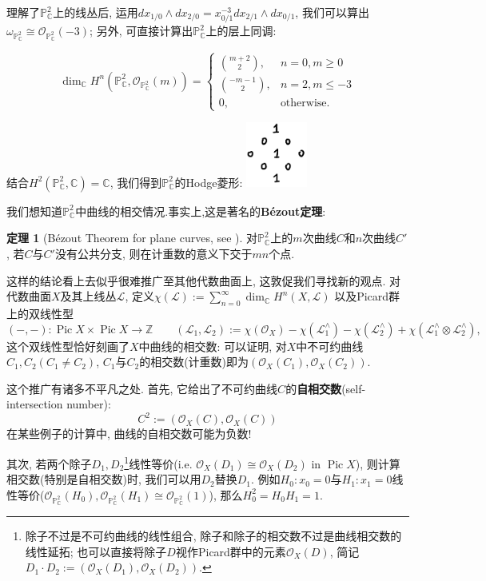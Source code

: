 \documentclass[UTF8,12pt,twoside]{article}
\theoremstyle{definition}
\newtheorem{thm}{定理}[section]
\newcommand{\ZZ}{\mathbb{Z}}  %
\newcommand{\CC}{\mathbb{C}}  %
\newcommand{\PCC}{\mathbb{P}_{\CC}^2} %
\newcommand{\Pic}{\operatorname{Pic}}
\numberwithin{equation}{section}
\begin{document}
理解了$\PCC$上的线丛后, 运用$dx_{1/0}\wedge dx_{2/0} = x_{0/1}^{-3}dx_{2/1} \wedge dx_{0/1}$, 我们可以算出$\omega_{\PCC} \cong \mathcal{O}_{\PCC} (-3)$; 另外, 可直接计算出$\PCC$上的层上同调\cite[18.1.3]{vakil2017rising}: 

$$\dim_{\CC}H^n\left(\PCC,\mathcal{O}_{\PCC}(m)\right)=\begin{cases}
\binom{m+2}{2},& n=0, m\geqslant 0\\
\binom{-m-1}{2}, & n=2,m \leqslant -3\\
0,& \text{otherwise.}
\end{cases}$$

结合$H^2(\PCC,\CC)=\CC$, 我们得到$\PCC$的Hodge菱形: \includegraphics[width=2cm]{9-7-fig/hodgeofp2.png}


我们想知道$\PCC$中曲线的相交情况.事实上,这是著名的\textbf{B\'ezout定理}:

\begin{thm}[B\'ezout Theorem for plane curves, see {\cite[18.6.K]{vakil2017rising}}]
	对$\PCC$上的$m$次曲线$C$和$n$次曲线$C'$, 若$C$与$C'$没有公共分支, 则在计重数的意义下交于$mn$个点.
\end{thm}

这样的结论看上去似乎很难推广至其他代数曲面上, 这敦促我们寻找新的观点. 对代数曲面$X$及其上线丛$\mathcal{L}$, 定义$\chi(\mathcal{L}):=\sum_{n=0}^{\infty}\dim_{\CC} H^n(X,\mathcal{L})$ 以及Picard群上的双线性型
$$(-,-):\Pic X \times \Pic X \longrightarrow \ZZ \qquad (\mathcal{L}_1,\mathcal{L}_2):=\chi(\mathcal{O}_X)-\chi(\mathcal{L}_1^{\wedge})-\chi(\mathcal{L}_2^{\wedge})+\chi(\mathcal{L}_1^{\wedge}\otimes \mathcal{L}_2^{\wedge}), $$
这个双线性型恰好刻画了$X$中曲线的相交数: 可以证明, 对$X$中不可约曲线$C_1,C_2(C_1 \neq C_2)$, $C_1$与$C_2$的相交数(计重数)即为$(\mathcal{O}_X(C_1),\mathcal{O}_X(C_2))$.

这个推广有诸多不平凡之处. 首先, 它给出了不可约曲线$C$的\textbf{自相交数}(self-intersection number): 
$$C^2:=(\mathcal{O}_X(C),\mathcal{O}_X(C))$$
在某些例子的计算中, 曲线的自相交数可能为负数!

其次, 若两个除子$D_1,D_2$\footnote{除子不过是不可约曲线的线性组合, 除子和除子的相交数不过是曲线相交数的线性延拓;      也可以直接将除子$D$视作Picard群中的元素$\mathcal{O}_X(D)$, 简记$D_1 \cdot D_2:= (\mathcal{O}_X(D_1),\mathcal{O}_X(D_2))$.}线性等价(i.e. $\mathcal{O}_X(D_1) \cong \mathcal{O}_X(D_2)$ in $\Pic X$), 则计算相交数(特别是自相交数)时, 我们可以用$D_2$替换$D_1$. 例如$H_0:x_0=0$与$H_1:x_1=0$线性等价($\mathcal{O}_{\PCC}(H_0), \mathcal{O}_{\PCC}(H_1) \cong \mathcal{O}_{\PCC}(1)$), 那么$H_0^2=H_0H_1=1$.
\end{document}
